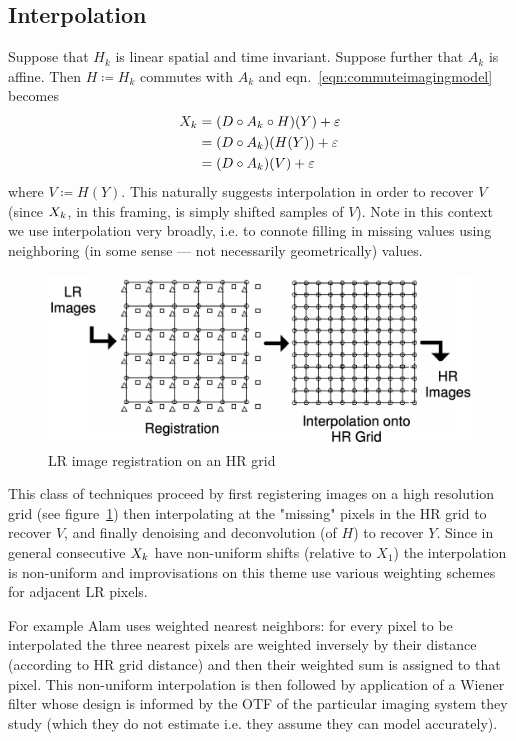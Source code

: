 \subsection{Interpolation}\label{subsec:interpolation}

Suppose that $H_k$ is linear spatial and time invariant.
%
Suppose further that $A_k$ is affine.
%
Then $H \coloneqq H_k$ commutes with $A_k$\cite{meladcommute} and eqn.~\eqref{eqn:commuteimagingmodel} becomes
\begin{equation}
	\label{eqn:commuteimagingmodel}
	\begin{split}
		\Xk &= (D \circ A_k \circ H) (Y) + \varepsilon \\
		&= (D \circ A_k) (H(Y)) + \varepsilon \\
		&= (D \circ A_k) (V) + \varepsilon
	\end{split}
\end{equation}
%
where $V \coloneqq H(Y)$.
%
This naturally suggests interpolation in order to recover $V$ (since $X_k$, in this framing, is simply shifted samples of $V$).
%
Note in this context we use interpolation very broadly, i.e. to connote filling in missing values using neighboring (in some sense --- not necessarily geometrically) values.
%
\begin{figure}
	\centering
	\includegraphics[width=\linewidth,keepaspectratio]{figures/hrgrid.png}
	\caption{LR image registration on an HR grid\cite{Lin}}
	\label{fig:hrgrid}
\end{figure}
This class of techniques proceed by first registering images on a high resolution grid (see figure~\ref{fig:hrgrid}) then interpolating at the "missing" pixels in the HR grid to recover $V$, and finally denoising and deconvolution (of $H$) to recover $Y$.
%
Since in general consecutive $X_k$ have non-uniform shifts (relative to $X_1$) the interpolation is non-uniform and improvisations on this theme use various weighting schemes for adjacent LR pixels.

For example Alam \cite{Alam2000} uses weighted nearest neighbors: for every pixel to be interpolated the three nearest pixels are weighted inversely by their distance (according to HR grid distance) and then their weighted sum is assigned to that pixel.
%
This non-uniform interpolation is then followed by application of a Wiener filter whose design is informed by the OTF of the particular imaging system they study (which they do not estimate i.e. they assume they can model accurately).
%
